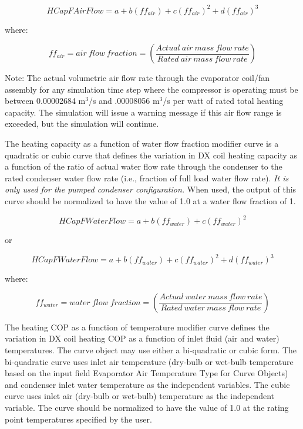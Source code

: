 \begin{equation}
HCapFAirFlow = a + b\left( {f{f_{air}}} \right) + c{\left( {f{f_{air}}} \right)^2} + d{\left( {f{f_{air}}} \right)^3}
\end{equation}

where:

\begin{equation}
f{f_{air}} = air~flow~fraction = \left( {\frac{{Actual~air~mass~flow~rate}}{{Rated~air~mass~flow~rate}}} \right)
\end{equation}

Note: The actual volumetric air flow rate through the evaporator coil/fan assembly for any simulation time step where the compressor is operating must be between 0.00002684 m\(^{3}\)/s and .00008056 m\(^{3}\)/s per watt of rated total heating capacity. The simulation will issue a warning message if this air flow range is exceeded, but the simulation will continue.

The heating capacity as a function of water flow fraction modifier curve is a quadratic or cubic curve that defines the variation in DX coil heating capacity as a function of the ratio of actual water flow rate through the condenser to the rated condenser water flow rate (i.e., fraction of full load water flow rate). \emph{It is only used for the pumped condenser configuration.} When used, the output of this curve should be normalized to have the value of 1.0 at a water flow fraction of 1.

\begin{equation}
HCapFWaterFlow = a + b\left( {f{f_{water}}} \right) + c{\left( {f{f_{water}}} \right)^2}
\end{equation}

or

\begin{equation}
HCapFWaterFlow = a + b\left( {f{f_{water}}} \right) + c{\left( {f{f_{water}}} \right)^2} + d{\left( {f{f_{water}}} \right)^3}
\end{equation}

where:

\begin{equation}
f{f_{water}} = water~flow~fraction = \left( {\frac{{Actual~water~mass~flow~rate}}{{Rated~water~mass~flow~rate}}} \right)
\end{equation}

The heating COP as a function of temperature modifier curve defines the variation in DX coil heating COP as a function of inlet fluid (air and water) temperatures. The curve object may use either a bi-quadratic or cubic form. The bi-quadratic curve uses inlet air temperature (dry-bulb or wet-bulb temperature based on the input field Evaporator Air Temperature Type for Curve Objects) and condenser inlet water temperature as the independent variables. The cubic curve uses inlet air (dry-bulb or wet-bulb) temperature as the independent variable. The curve should be normalized to have the value of 1.0 at the rating point temperatures specified by the user.

